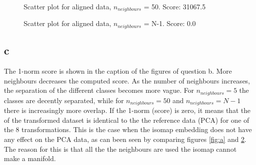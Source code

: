 \documentclass[a4paper,12pt]{article}
\begin{document}
\begin{figure}[H]
\hfill
{}
\hfill
\caption{Scatter plot for aligned data, $n_{neighbours}$ = 50. Score: 31067.5 }
\label{52}
\end{figure}

\begin{figure}[H]
\hfill
{}
\hfill
\caption{Scatter plot for aligned data, $n_{neighbours}$ = N-1. Score: 0.0 }
\label{53}
\end{figure}
\subsection{c}
The 1-norm score is shown in the caption of the figures of question b. More neighbours decreases the computed score. As the number of neighbours increases, the separation of the different classes becomes more vague. For $n_{neighbours}=5$ the classes are decently separated, while for $n_{neighbours}=50$ and $n_{neighbours}=N-1$ there is increasingly more overlap. If the 1-norm (score) is zero, it means that the of the transformed dataset is identical to the the reference data (PCA) for one of the 8 transformations.
This is the case when the isomap embedding does not have any effect on the PCA data, as can been seen by comparing figures \ref{fig:a} and \ref{53}. The reason for this is that  all the the neighbours are used the isomap cannot make a manifold. 
\end{document}
